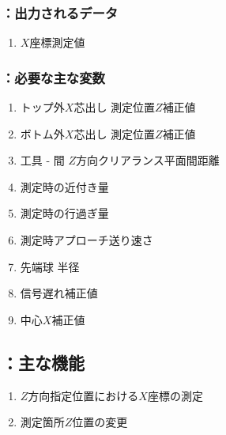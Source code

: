 \subsubsection{\MXIface：出力されるデータ}
\begin{enumerate}[label*=\sarrow]
\item \OutcutCenter$X$座標測定値
\end{enumerate}

\subsubsection{\MXIface：必要な主な変数}
\begin{enumerate}[label*=\sarrow]
\item トップ外$X$芯出し 測定位置$Z$補正値
\item ボトム外$X$芯出し 測定位置$Z$補正値
\item 工具 - \EndFace 間 $Z$方向クリアランス平面間距離
\item \TouchSensorProbe 測定時の近付き量
\item \TouchSensorProbe 測定時の行過ぎ量
\item \TouchSensorProbe 測定時アプローチ送り速さ
\item \TouchSensorProbe 先端球 半径
\item \TouchSensorProbe 信号遅れ補正値
\item \TouchSensorProbe 中心$X$補正値
\end{enumerate}


\subsection{\MXIface：主な機能}
\begin{enumerate}[label*=\sarrow]
\item $Z$方向指定位置における\OutcutCenter$X$座標の測定
\item 測定箇所$Z$位置の変更
\end{enumerate}


